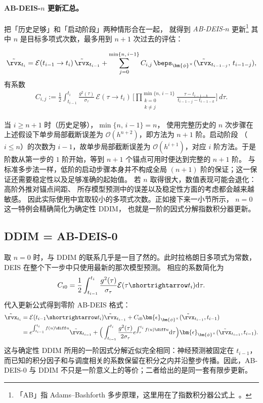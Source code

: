 \paragraph{AB-DEIS-$n$ 更新汇总。}
把「历史足够」和「启动阶段」两种情形合在一起，
就得到 \emph{AB-DEIS-$n$} 更新\footnote{「AB」指 Adams--Bashforth
多步原理，这里用在了指数积分器公式上~\citep{hochbruck2010exponential}。}
其中 $n$ 是目标多项式次数，最多用到 $n{+}1$ 次过去的评估：
\begin{mdframed}
\begin{align*}
\tilde\rvx_{t_i}
= \mathcal{E}(t_{i-1} \to t_i)\,\tilde\rvx_{t_{i-1}}
+ \sum_{j=0}^{\min\{n,\, i-1\}} C_{i,j}\,\beps_{\bm{\phi}^\times}(\tilde\rvx_{t_{i-1-j}},\,t_{i-1-j}),
\end{align*}
有系数
\begin{align*}
C_{i,j}
:= \frac{1}{2} \int_{t_{i-1}}^{t_i}
\frac{g^2(\tau)}{\sigma_\tau}\,\mathcal{E}(\tau \to t_i)\,
\Bigg[\prod_{\substack{k=0\\k\neq j}}^{\min\{n,\, i-1\}}
\frac{\tau - t_{i-1-k}}{\,t_{i-1-j} - t_{i-1-k}\,}\Bigg]\,d\tau.
\end{align*}
\end{mdframed}

当 $i\ge n{+}1$ 时（历史足够），$\min\{n,\,i-1\}=n$，
使用完整历史的 $n$ 次步骤在上述假设下单步局部截断误差为
$\mathcal O(h^{n+2})$，即方法为 $n+1$ 阶。启动阶段
（$i\le n$）的次数为 $i-1$，故单步局部截断误差为
$\mathcal O(h^{i+1})$，对应 $i$ 阶方法。于是阶数从第一步的 $1$ 阶开始，等到 $n+1$ 个锚点可用时便达到完整的 $n+1$ 阶。
与标准多步法一样，低阶的启动步骤本身并不构成全局
$(n+1)$ 阶的保证；这一保证还需要稳定性以及足够准确的起始值。
若 $n$ 取得很大，数值表现可能会退化：高阶外推对锚点间距、
所存模型预测中的误差以及稳定性方面的考虑都会越来越敏感。
因此实际使用中宜取较小的多项式次数。正如接下来一小节所示，
$n{=}0$ 这一特例会精确简化为确定性 DDIM，
也就是一阶的因式分解指数积分器更新。
\subsection{DDIM = AB-DEIS-0}
\label{sec:ddim-deis}

取 $n=0$ 时，与 DDIM 的联系几乎是一目了然的。此时拉格朗日多项式为常数，DEIS 在整个下一步中只使用最新的那次模型预测。
相应的系数简化为
\[
C_{i0} = \frac{1}{2} \int_{t_{i-1}}^{t_{i}} \frac{g^2(\tau)}{\sigma_\tau} \mathcal{E}(\tau \shortrightarrow t_i)   \mathrm{d}\tau.
\]
代入更新公式得到零阶 AB-DEIS 格式：
\begin{align}\label{eq:deis-0}
  \tilde\rvx_{t_{i}} &=  \mathcal{E}(t_{i-1} \shortrightarrow t_{i})\tilde\rvx_{t_{i-1}} + C_{i0} \bm{\epsilon}_{\bm{\phi}^\times}(\tilde\rvx_{t_{i-1}}, t_{i-1})\nonumber\\
  &=e^{\int_{t_{i-1}}^{t_{i}}f(u)\diff u} \tilde\rvx_{t_{i-1}} + \Big( \int_{t_{i-1}}^{t_{i}} \frac{g^2(\tau)}{2\sigma_\tau} e^{\int_{\tau}^{t_{i}}f(u)\diff u}   \mathrm{d}\tau
\Big) \bm{\epsilon}_{\bm{\phi}^\times}(\tilde\rvx_{t_{i-1}}, t_{i-1}).
\end{align}
这与确定性 DDIM 所用的一阶因式分解近似完全相同：神经预测被固定在 $t_{i-1}$，而已知的积分因子和与调度相关的系数保留在积分之内并沿整步传播。因此，AB-DEIS-0 与 DDIM
不只是一阶意义上的等价；二者给出的是同一套有限步更新。

